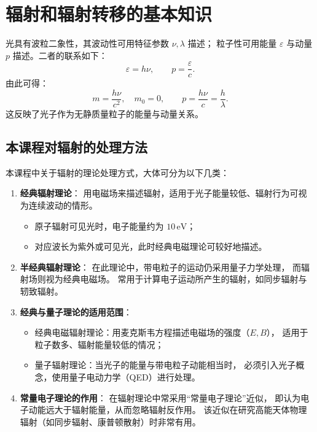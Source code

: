 \section{辐射和辐射转移的基本知识}


光具有波粒二象性，其波动性可用特征参数 $\nu,\lambda$ 描述；
粒子性可用能量 $\varepsilon$ 与动量 $p$ 描述。二者的联系如下：
\[
\varepsilon = h\nu,\qquad p = \frac{\varepsilon}{c}.
\]
由此可得：
\[
m = \frac{h\nu}{c^2},\quad m_0=0,\qquad 
p = \frac{h\nu}{c} = \frac{h}{\lambda}.
\]
这反映了光子作为无静质量粒子的能量与动量关系。

\subsection{本课程对辐射的处理方法}

本课程中关于辐射的理论处理方式，大体可分为以下几类：

\begin{enumerate}[label=\textbf{(\arabic*)}]
  \item \textbf{经典辐射理论}：
  用电磁场来描述辐射，适用于光子能量较低、辐射行为可视为连续波动的情形。
  \begin{itemize}
    \item 原子辐射可见光时，电子能量约为 $10\,\mathrm{eV}$；
    \item 对应波长为紫外或可见光，此时经典电磁理论可较好地描述。
  \end{itemize}

  \item \textbf{半经典辐射理论}：
  在此理论中，带电粒子的运动仍采用量子力学处理，
  而辐射场则视为经典电磁场。
  常用于计算电子运动所产生的辐射，如同步辐射与轫致辐射。

  \item \textbf{经典与量子理论的适用范围}：
  \begin{itemize}
    \item 经典电磁辐射理论：用麦克斯韦方程描述电磁场的强度（$E, B$），
          适用于粒子数多、辐射能量较低的情况；
    \item 量子辐射理论：当光子的能量与带电粒子动能相当时，
          必须引入光子概念，使用量子电动力学（QED）进行处理。
  \end{itemize}

  \item \textbf{常量电子理论的作用}：
  在辐射理论中常采用“常量电子理论”近似，
  即认为电子动能远大于辐射能量，从而忽略辐射反作用。
  该近似在研究高能天体物理辐射（如同步辐射、康普顿散射）时非常有用。
\end{enumerate}

